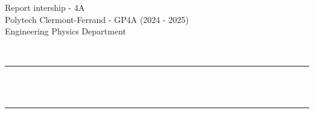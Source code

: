 
\begin{titlepage}


	  

\begin{center}
	\Large{Report intership - 4A} \\
	\Large{Polytech Clermont-Ferrand - GP4A (2024 - 2025)}	\\
	Engineering Physics Department
\end{center}
\vspace*{-2cm}
	\newcommand{\HRule}{\rule{\linewidth}{0.5mm}}
	\centering 
	\quad\\[1.5cm]
	
	
	\makeatletter
	\HRule \\[0.35cm]
	{ \huge \bfseries \@title}\\[0.3cm] 
	\HRule \\[1cm]
	
	

\begin{center}
	\@author \\
	\vspace*{0.4cm}

\end{center}
	
	
	\vspace{2cm}
	







	
	
	
	
	
	
	
	
	
	
	\vfill 
	
\end{titlepage}

